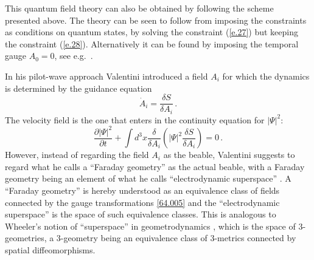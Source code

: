 \documentclass[12pt]{article}
\begin{document}
This quantum field theory can also be obtained by following the scheme presented above. The theory can be seen to follow from imposing the constraints as conditions on quantum states, by solving the constraint ({\ref{e.27}}) but keeping the constraint ({\ref{e.28}}). Alternatively it can be found by imposing the temporal gauge $A_0=0$, see e.g.\ \cite[p.\ 398]{jackiw95}.

In his pilot-wave approach Valentini introduced a field $A_i$ for which the dynamics is determined by the guidance equation
\begin{equation}
{\dot A}_{i}  = \frac{\delta S}{\delta A_i } \,.
\label{74}
\end{equation}
The velocity field is the one that enters in the continuity equation for $|\Psi|^2$:
\begin{equation}
\frac{\partial |\Psi|^2}{\partial t}  +   \int d^3x  \frac{\delta }{\delta  A_{i} }  \left(|\Psi|^2 \frac{\delta S}{\delta A_i } \right) =0\,. 
\label{71}
\end{equation}
However, instead of regarding the field $A_i$ as the beable, Valentini suggests to regard what he calls a ``Faraday geometry'' as the actual beable, with a Faraday geometry being an element of what he calls ``electrodynamic superspace'' \cite[p.\ 73]{valentini92}. A ``Faraday geometry'' is hereby understood as an equivalence class of fields connected by the gauge transformations \eqref{64.005} and the ``electrodynamic superspace'' is the space of such equivalence classes. This is analogous to Wheeler's notion of ``superspace'' in geometrodynamics \cite{wheeler64,wheeler68}, which is the space of 3-geometries, a 3-geometry being an equivalence class of 3-metrics connected by spatial diffeomorphisms. 
\end{document}
